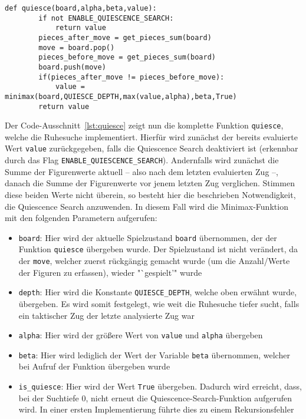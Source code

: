 \begin{lstlisting}[caption=Funktion für die Implementierung der Ruhesuche, label=lst:quiesce]
	def quiesce(board,alpha,beta,value):
    	if not ENABLE_QUIESCENCE_SEARCH:
			return value
		pieces_after_move = get_pieces_sum(board)
		move = board.pop()
		pieces_before_move = get_pieces_sum(board)
		board.push(move)
		if(pieces_after_move != pieces_before_move):
			value = minimax(board,QUIESCE_DEPTH,max(value,alpha),beta,True)
		return value
\end{lstlisting}

Der Code-Ausschnitt~\ref{lst:quiesce} zeigt nun die komplette Funktion \texttt{quiesce}, welche die Ruhesuche implementiert. Hierfür wird zunächst der bereits evaluierte Wert \texttt{value} zurückgegeben, falls die Quiescence Search deaktiviert ist (erkennbar durch das Flag \texttt{ENABLE\_QUIESCENCE\_SEARCH}). Andernfalls wird zunächst die Summe der Figurenwerte aktuell -- also nach dem letzten evaluierten Zug --, danach die Summe der Figurenwerte vor jenem letzten Zug verglichen. Stimmen diese beiden Werte nicht überein, so besteht hier die beschrieben Notwendigkeit, die Quiescence Search anzuwenden. In diesem Fall wird die Minimax-Funktion mit den folgenden Parametern aufgerufen:

\begin{itemize}
	\item \texttt{board}: Hier wird der aktuelle Spielzustand \texttt{board} übernommen, der der Funktion \texttt{quiesce} übergeben wurde. Der Spielzustand ist nicht verändert, da der \texttt{move}, welcher zuerst rückgängig gemacht wurde (um die Anzahl/Werte der Figuren zu erfassen), wieder "`gespielt'" wurde
	\item \texttt{depth}: Hier wird die Konstante \texttt{QUIESCE\_DEPTH}, welche oben erwähnt wurde, übergeben. Es wird somit festgelegt, wie weit die Ruhesuche tiefer sucht, falls ein taktischer Zug der letzte analysierte Zug war
	\item \texttt{alpha}: Hier wird der größere Wert von \texttt{value} und \texttt{alpha} übergeben
	\item \texttt{beta}: Hier wird lediglich der Wert der Variable \texttt{beta} übernommen, welcher bei Aufruf der Funktion übergeben wurde
	\item \texttt{is\_quiesce}: Hier wird der Wert \texttt{True} übergeben. Dadurch wird erreicht, dass, bei der Suchtiefe $0$, nicht erneut die Quiescence-Search-Funktion aufgerufen wird. In einer ersten Implementierung führte dies zu einem Rekursionsfehler
\end{itemize}

